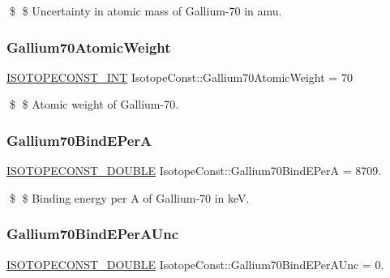 \$ \$ Uncertainty in atomic mass of Gallium-\/70 in amu. \mbox{\label{group___isotope_const-_gallium-_ga70_ga61a402130aa12f63bd74d361cb2720a9}} 
\subsubsection{\texorpdfstring{Gallium70\+Atomic\+Weight}{Gallium70AtomicWeight}}
{\footnotesize\ttfamily \mbox{\hyperlink{group___isotope_const-_macros_ga5f18360b3e99483a35c32d789e62621c}{I\+S\+O\+T\+O\+P\+E\+C\+O\+N\+S\+T\+\_\+\+I\+NT}} Isotope\+Const\+::\+Gallium70\+Atomic\+Weight = 70}

\$ \$ Atomic weight of Gallium-\/70. \mbox{\label{group___isotope_const-_gallium-_ga70_ga18b84d6f71c04ae674bbea40912c21e7}} 
\subsubsection{\texorpdfstring{Gallium70\+Bind\+E\+PerA}{Gallium70BindEPerA}}
{\footnotesize\ttfamily \mbox{\hyperlink{group___isotope_const-_macros_ga8f45a7272ce02c0b4c65c44636ed719a}{I\+S\+O\+T\+O\+P\+E\+C\+O\+N\+S\+T\+\_\+\+D\+O\+U\+B\+LE}} Isotope\+Const\+::\+Gallium70\+Bind\+E\+PerA = 8709.}

\$ \$ Binding energy per A of Gallium-\/70 in keV. \mbox{\label{group___isotope_const-_gallium-_ga70_ga033d41c3c33a16f42b2d854359dd2c9c}} 
\subsubsection{\texorpdfstring{Gallium70\+Bind\+E\+Per\+A\+Unc}{Gallium70BindEPerAUnc}}
{\footnotesize\ttfamily \mbox{\hyperlink{group___isotope_const-_macros_ga8f45a7272ce02c0b4c65c44636ed719a}{I\+S\+O\+T\+O\+P\+E\+C\+O\+N\+S\+T\+\_\+\+D\+O\+U\+B\+LE}} Isotope\+Const\+::\+Gallium70\+Bind\+E\+Per\+A\+Unc = 0.}

